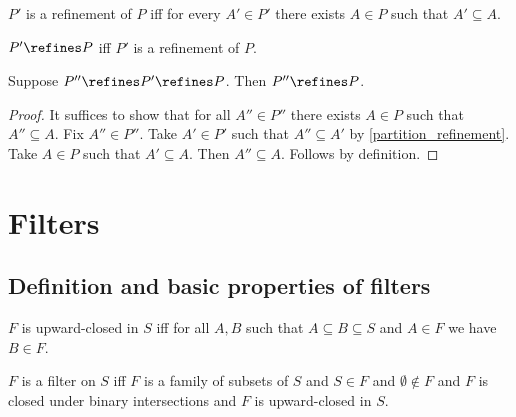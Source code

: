 \begin{definition}\label{partition_refinement}
    $P'$ is a refinement of $P$ iff
    for every $A'\in P'$ there exists
    $A\in P$ such that $A'\subseteq A$.
\end{definition}

\begin{abbreviation}\label{partition_refines}
    $P'\refines P$ iff
    $P'$ is a refinement of $P$.
\end{abbreviation}

\begin{proposition}\label{partition_refinement_transitive}
    Suppose $P''\refines P'\refines P$.
    Then $P''\refines P$.
\end{proposition}
\begin{proof}
    It suffices to show that for all $A''\in P''$ there exists $A\in P$ such that $A''\subseteq A$.
    Fix $A''\in P''$.
    Take $A'\in P'$ such that $A''\subseteq A'$
        by \cref{partition_refinement}.
    Take $A\in P$ such that $A'\subseteq A$.
    Then $A''\subseteq A$.
    Follows by definition. %
\end{proof}

\section{Filters}

\subsection{Definition and basic properties of filters}

\begin{abbreviation}\label{upwardclosed}
    $F$ is upward-closed in $S$ iff
    for all $A, B$ such that $A\subseteq B\subseteq S$ and $A\in F$ we have $B\in F$.
\end{abbreviation}

\begin{definition}\label{filter}
    $F$ is a filter on $S$ iff
    $F$ is a family of subsets of $S$
    and $S\in F$
    and $\emptyset\notin F$
    and $F$ is closed under binary intersections
    and $F$ is upward-closed in $S$.
\end{definition}

